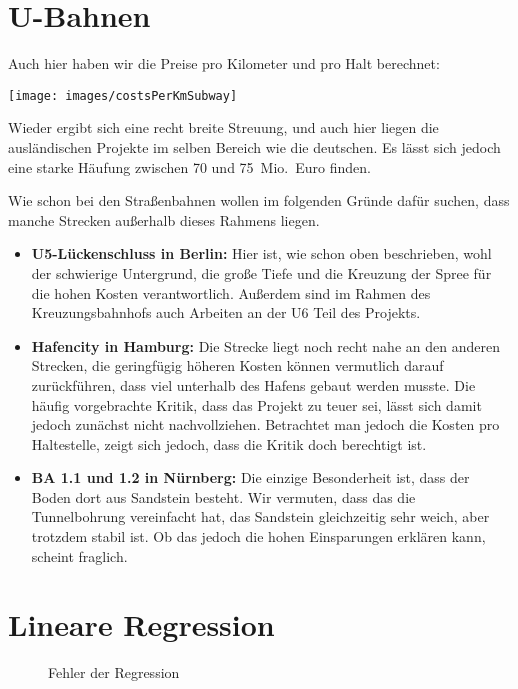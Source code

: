 \section{U-Bahnen}

Auch hier haben wir die Preise pro Kilometer und pro Halt berechnet:

\nopagebreak

\texttt{[image: images/costsPerKmSubway]}

Wieder ergibt sich eine recht breite Streuung, und auch hier liegen die ausländischen Projekte im selben Bereich wie die deutschen.
Es lässt sich jedoch eine starke Häufung zwischen 70 und 75{\ }Mio.{\ }Euro finden.

Wie schon bei den Straßenbahnen wollen im folgenden Gründe dafür suchen, dass manche Strecken außerhalb dieses Rahmens liegen.

\begin{itemize}
    \item \textbf{U5-Lückenschluss in Berlin:} Hier ist, wie schon oben beschrieben, wohl der schwierige Untergrund, die große Tiefe und die Kreuzung der Spree für die hohen Kosten verantwortlich. Außerdem sind im Rahmen des Kreuzungsbahnhofs auch Arbeiten an der U6 Teil des Projekts.
    \item \textbf{Hafencity in Hamburg:} Die Strecke liegt noch recht nahe an den anderen Strecken, die geringfügig höheren Kosten können vermutlich darauf zurückführen, dass viel unterhalb des Hafens gebaut werden musste. Die häufig vorgebrachte Kritik, dass das Projekt zu teuer sei, lässt sich damit jedoch zunächst nicht nachvollziehen. Betrachtet man jedoch die Kosten pro Haltestelle, zeigt sich jedoch, dass die Kritik doch berechtigt ist.
    \item \textbf{BA 1.1 und 1.2 in Nürnberg:} Die einzige Besonderheit ist, dass der Boden dort aus Sandstein besteht. Wir vermuten, dass das die Tunnelbohrung vereinfacht hat, das Sandstein gleichzeitig sehr weich, aber trotzdem stabil ist. Ob das jedoch die hohen Einsparungen erklären kann, scheint fraglich.
\end{itemize}


\section{Lineare Regression}

\begin{figure}[h]

\caption{Fehler der Regression}
\label{regtram}
\end{figure}

